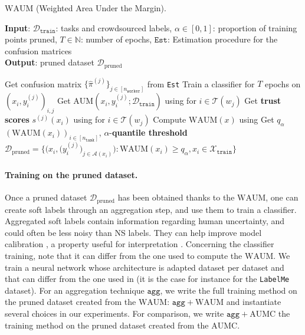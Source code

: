 \begin{algorithm}[tb]
\caption{$\mathrm{WAUM}$ (Weighted Area Under the Margin).}
\label{alg:WAUMstack}
\textbf{Input}:  $\mathcal{D}_{\texttt{train}}$: tasks and crowdsourced labels, $\alpha\in[0,1]$: proportion of training points pruned, $T\in \mathbb{N}$: number of epochs, $\texttt{Est}$: Estimation procedure for the confusion matrices\\
\textbf{Output}: pruned dataset $\mathcal{D}_{\text{pruned}}$
\begin{algorithmic}[1]
\STATE Get confusion matrix $\{\hat{\pi}^{(j)}\}_{j\in[n_\texttt{worker}]}$ from \texttt{Est}
\STATE Train a classifier for $T$ epochs on $\left(x_i, y_i^{(j)}\right)_{i,j}$
\STATE Get $\mathrm{AUM}(x_i, y_i^{(j)}; \mathcal{D}_{\texttt{train}})$ using  for $i\in\mathcal{T}(w_j)$
\STATE Get \textbf{trust scores} $s^{(j)}(x_i)$ using  for $i\in\mathcal{T}(w_j)$
\ENDFOR
{}
\STATE Compute $\mathrm{WAUM}(x)$ using \;
\ENDFOR
\STATE  Get $q_{\alpha}$ $(\mathrm{WAUM}(x_i))_{i\in[n_\texttt{task}]}$, $\alpha$-\textbf{quantile threshold}
\STATE $\mathcal{D}_{\text{pruned}}\!=\!
        \Big\{
        \big( x_i, \big(y_i^{(j)}\big)_{j\in\mathcal{A}(x_i)}\big) \! : \!\mathrm{WAUM}(x_i) \geq q_\alpha,  x_i \in \mathcal{X}_\texttt{train}  \Big
        \}$
\end{algorithmic}
\end{algorithm}

\paragraph{Training on the pruned dataset.}
Once a pruned dataset $\mathcal{D}_{\text{pruned}}$ has been obtained thanks to the $\mathrm{WAUM}$, one can create soft labels through an aggregation step, and use them to train a classifier.
Aggregated soft labels contain information regarding human uncertainty, and could often be less noisy than NS labels.
They can help improve model calibration \citep{wen2020combining, zhong2021improving}, a property useful for interpretation \citep{jiang2012calibrating, kumar2019verified}.
Concerning the classifier training, note that it can differ from the one used to compute the $\mathrm{WAUM}$.
We train a neural network whose architecture is adapted dataset per dataset and that can differ from the one used in  (it is the case for instance for the \texttt{LabelMe} dataset).
For an aggregation technique $\texttt{agg}$, we write the full training method on the pruned dataset created from the $\mathrm{WAUM}$: $\texttt{agg}+\mathrm{WAUM}$ and instantiate several choices in our experiments.
For comparison, we write $\texttt{agg} + \mathrm{AUMC}$ the training method on the pruned dataset created from the $\mathrm{AUMC}$.

